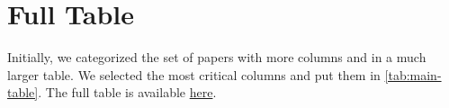 \section{Full Table}
\label{sec:full-table}
Initially, we categorized the set of papers with more columns and in a much larger table. 
We selected the most critical columns and put them in \cref{tab:main-table}. 
The full table is available \href{https://docs.google.com/spreadsheets/d/1sz14O-yDBSnNalJqhIsEaVaLeQ-C5SPqAFSMErU9hGM/edit?usp=sharing}{here}. 
